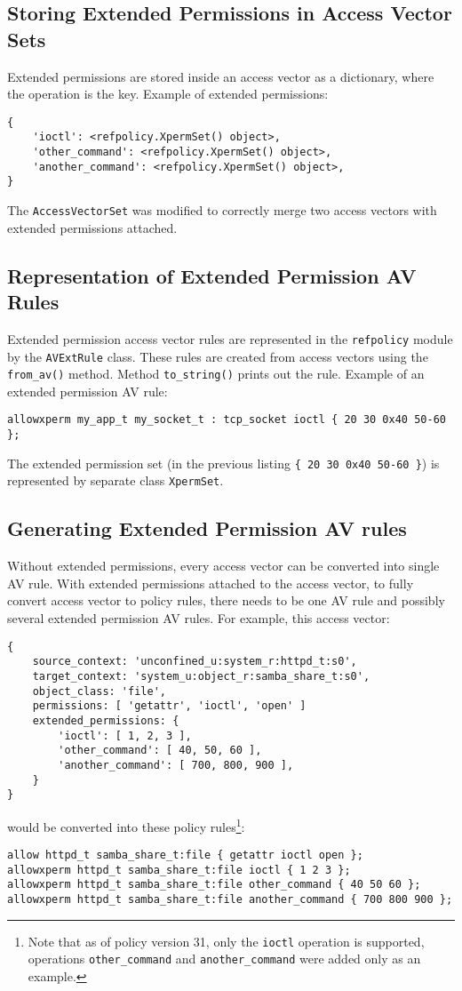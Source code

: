 \subsection{Storing Extended Permissions in Access Vector Sets}
Extended permissions are stored inside an access vector as a dictionary, where
the operation is the key. Example of extended permissions:
\begin{lstlisting}
{
    'ioctl': <refpolicy.XpermSet() object>,
    'other_command': <refpolicy.XpermSet() object>,
    'another_command': <refpolicy.XpermSet() object>,
}
\end{lstlisting}
The \texttt{AccessVectorSet} was modified to correctly merge two access vectors
with extended permissions attached.

\subsection{Representation of Extended Permission AV Rules}
Extended permission access vector rules are represented in the
\texttt{refpolicy} module by the \texttt{AVExtRule} class. These rules are
created from access vectors using the \texttt{from\_av()} method. Method
\texttt{to\_string()} prints out the rule. Example of an extended permission AV
rule:
\begin{lstlisting}
allowxperm my_app_t my_socket_t : tcp_socket ioctl { 20 30 0x40 50-60 };
\end{lstlisting}

The extended permission set (in the previous listing \texttt{\{ 20 30 0x40 50-60
\}}) is represented by separate class \texttt{XpermSet}.

\subsection{Generating Extended Permission AV rules}
Without extended permissions, every access vector can be converted into single
AV rule. With extended permissions attached to the access vector, to fully
convert access vector to policy rules, there needs to be one AV rule and
possibly several extended permission AV rules. For example, this access vector:
\begin{lstlisting}
{
    source_context: 'unconfined_u:system_r:httpd_t:s0',
    target_context: 'system_u:object_r:samba_share_t:s0',
    object_class: 'file',
    permissions: [ 'getattr', 'ioctl', 'open' ]
    extended_permissions: {
        'ioctl': [ 1, 2, 3 ],
        'other_command': [ 40, 50, 60 ],
        'another_command': [ 700, 800, 900 ],
    }
}
\end{lstlisting}
would be converted into these policy rules\footnote{Note that as of policy
version 31, only the \texttt{ioctl} operation is supported, operations
\texttt{other\_command} and \texttt{another\_command} were added only as an
example.}:
\begin{lstlisting}
allow httpd_t samba_share_t:file { getattr ioctl open };
allowxperm httpd_t samba_share_t:file ioctl { 1 2 3 };
allowxperm httpd_t samba_share_t:file other_command { 40 50 60 };
allowxperm httpd_t samba_share_t:file another_command { 700 800 900 };
\end{lstlisting}


